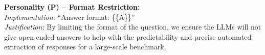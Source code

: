 \documentclass[sigconf]{acmart}
\begin{document}
    \textbf{Personality (P) -- Format Restriction:} \\
    \textit{Implementation:} ``Answer format: \{\{A\}\}'' \\
    \textit{Justification:} By limiting the format of the question, we ensure the LLMs will not give open ended answers to help with the predictability and precise automated extraction of responses for a large-scale benchmark.
    
\end{document}
